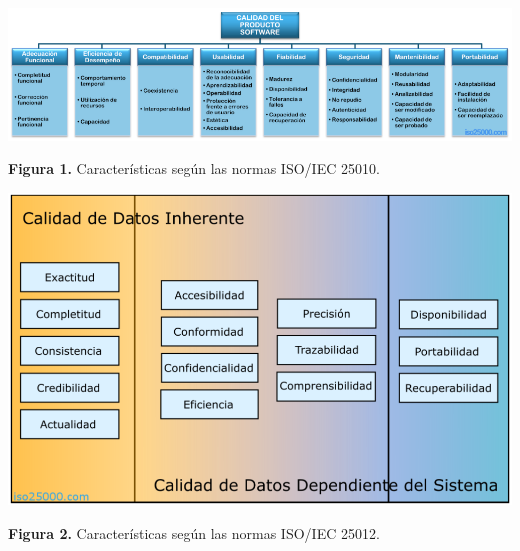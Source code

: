 \documentclass[https://www.overleaf.com/project/63761df255a8a9f4a15c3579
	letterpaper, %
	10pt, %
]{CSUniSchoolLabReport}
\begin{document}
        \begin{center}
            \includegraphics[width=1.0\linewidth]{image.png}
        \end{center}
        \begin{center}
            \textbf{Figura 1.}\hspace{0.5em} Características según las normas ISO/IEC 25010.
        \end{center}

        \begin{center}
            \includegraphics[width=1\linewidth]{image2.png}
        \end{center}
        \begin{center}
            \textbf{Figura 2.}\hspace{0.5em} Características según las normas ISO/IEC 25012.
        \end{center}

    
\end{document}
